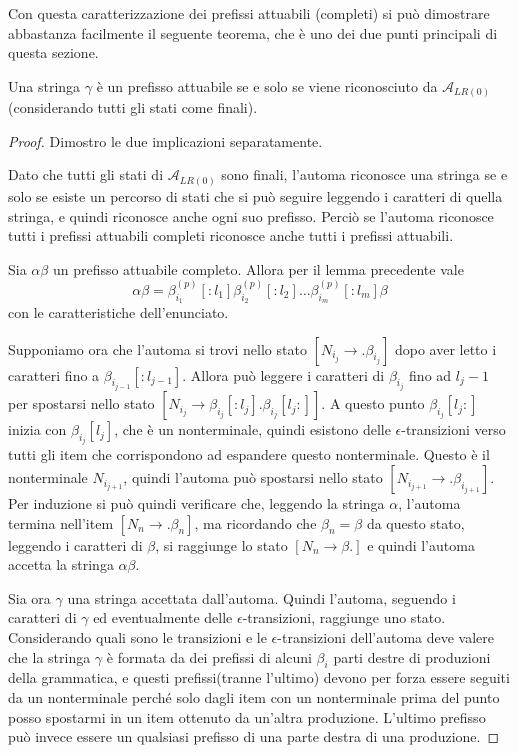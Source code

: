 \documentclass[12pt]{article}
\numberwithin{theorem}{subsection}
\begin{document}
Con questa caratterizzazione dei prefissi attuabili (completi) si può dimostrare abbastanza facilmente il seguente teorema, che è uno dei due punti principali di questa sezione.
\begin{theorem}\label{th:pref-attuabile-sse-automa}
	Una stringa $\gamma$ è un prefisso attuabile se e solo se viene riconosciuto da $\mathcal{A}_{LR(0)}$ (considerando tutti gli stati come finali).
\end{theorem}
\begin{proof}
	Dimostro le due implicazioni separatamente.
	
	\vspace{0.8cm}
	Dato che tutti gli stati di $\mathcal{A}_{LR(0)}$ sono finali, l'automa riconosce una stringa se e solo se esiste un percorso di stati che si può seguire leggendo i caratteri di quella stringa, e quindi riconosce anche ogni suo prefisso. Perciò se l'automa riconosce tutti i prefissi attuabili completi riconosce anche tutti i prefissi attuabili.
	
	Sia $\alpha \beta$ un prefisso attuabile completo. Allora per il lemma precedente vale
	\[
	\alpha\beta = \beta_{i_1}^{(p)}[:l_1] \beta_{i_2}^{(p)}[:l_2] \dots \beta_{i_m}^{(p)}[:l_m]\beta
	\]
	con le caratteristiche dell'enunciato.

	Supponiamo ora che l'automa si trovi nello stato $[ N_{i_j} \rightarrow . \beta_{i_j} ]$ dopo aver letto i caratteri fino a $\beta_{i_{j - 1}}[:l_{j-1}]$. Allora può leggere i caratteri di $\beta_{i_j}$ fino ad $l_j - 1$ per spostarsi nello stato $[ N_{i_j} \rightarrow \beta_{i_j}[:l_j] . \beta_{i_j}[l_j:] ]$. A questo punto $\beta_{i_j}[l_j:]$ inizia con $\beta_{i_j}[l_j]$, che è un nonterminale, quindi esistono delle $\epsilon$-transizioni verso tutti gli item che corrispondono ad espandere questo nonterminale. Questo è il nonterminale $N_{i_{j+1}}$, quindi l'automa può spostarsi nello stato $[ N_{i_{j + 1}} \rightarrow . \beta_{i_{j + 1}} ]$.
	Per induzione si può quindi verificare che, leggendo la stringa $\alpha$, l'automa termina nell'item $[ N_n \rightarrow . \beta_n ]$, ma ricordando che $\beta_n = \beta$ da questo stato, leggendo i caratteri di $\beta$, si raggiunge lo stato $[ N_n \rightarrow \beta . ]$ e quindi l'automa accetta la stringa $\alpha \beta$.

	\vspace{0.7cm}
	
	Sia ora $\gamma$ una stringa accettata dall'automa. Quindi l'automa, seguendo i caratteri di $\gamma$ ed eventualmente delle $\epsilon$-transizioni, raggiunge uno stato. Considerando quali sono le transizioni e le $\epsilon$-transizioni dell'automa deve valere che la stringa $\gamma$ è formata da dei prefissi di alcuni $\beta_i$ parti destre di produzioni della grammatica, e questi prefissi(tranne l'ultimo) devono per forza essere seguiti da un nonterminale perché solo dagli item con un nonterminale prima del punto posso spostarmi in un item ottenuto da un'altra produzione. L'ultimo prefisso può invece essere un qualsiasi prefisso di una parte destra di una produzione.
	

\end{proof}
\end{document}
